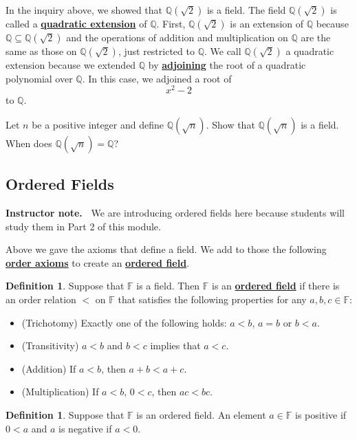 \documentclass[11pt]{article}
\newenvironment{bignote}[1][Instructor note]%
	{\begin{mdframed}\raggedright{\bf #1.~}}
	{\end{mdframed}}
\newenvironment{task}
	{\begin{mdframed}[linecolor=lightgray, linewidth=3pt]\raggedright}
	{\end{mdframed}}
\renewcommand\emph[1]{\underline{\bf{#1}}} %
\theoremstyle{definition}
\newtheorem{definition}[theorem]{Definition}
\begin{document}
In the inquiry above, we showed that $\mathbb{Q}(\sqrt{2})$ is a field.  The field $\mathbb{Q}(\sqrt{2})$ is called a \emph{quadratic extension}
of $\mathbb{Q}$. First, $\mathbb{Q}(\sqrt{2})$ is an extension of $\mathbb{Q}$ because $\mathbb{Q}\subseteq \mathbb{Q}(\sqrt{2})$ and the operations of addition and
multiplication on $\mathbb{Q}$ are the same as those on $\mathbb{Q}(\sqrt{2})$, just restricted to $\mathbb{Q}$. We call $\mathbb{Q}(\sqrt{2})$ a
quadratic extension because we extended $\mathbb{Q}$ by \emph{adjoining} the root of a quadratic polynomial over $\mathbb{Q}$. In this case, we adjoined
a root of
\[ x^2 -2 \]
to $\mathbb{Q}$. 

\begin{task}
  Let $n$ be a positive integer and define $\mathbb{Q}(\sqrt{n})$. Show that $\mathbb{Q}(\sqrt{n})$ is a field. When does $\mathbb{Q}(\sqrt{n})=\mathbb{Q}$?
\end{task}

\subsection{Ordered Fields}

\begin{bignote}
 We are introducing ordered fields here because students will study them in Part 2 of this module. 
\end{bignote}

Above we gave the axioms that define a field. We add to those the following \emph{order axioms} to create an \emph{ordered field}.

\begin{definition} Suppose that $\mathbb{F}$ is a field. Then $\mathbb{F}$ is an \emph{ordered field} if there is an order
  relation $<$ on $\mathbb{F}$ that satisfies the following properties for any $a,b,c\in\mathbb{F}$:
\begin{itemize}
  \item (Trichotomy) Exactly one of the following holds: $a < b$, $a=b$ or $b < a$.
  \item (Transitivity) $a< b$ and $b < c$ implies that $a < c$.
  \item (Addition) If $a< b$, then $a+b < a+c$.
  \item (Multiplication) If $a < b$, $0 < c$, then $ac < bc$.
\end{itemize}
\end{definition}

\begin{definition}
  Suppose that $\mathbb{F}$ is an ordered field. An element $a\in\mathbb{F}$ is positive if $0 < a$ and $a$ is negative if $a < 0$.
\end{definition}
\end{document}
